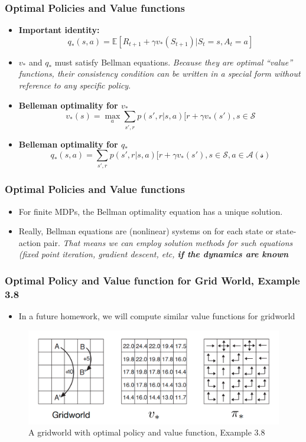 \documentclass{beamer}
\begin{document}
\begin{frame}
  \frametitle{Optimal Policies and Value functions \cite{Sutton2018}}
  \begin{itemize}
  \item {\bf Important identity:}
    \[q_*(s,a) = \mathbb{E}[R_{t+1} + \gamma v_*(S_{t+1}) | S_t = s, A_t = a] \]
  \item $v_*$ and $q_*$ must satisfy Bellman equations. {\em Because they are optimal
      ``value'' functions, their consistency condition can be written in a special form
      without reference to any specific policy}.
  \item {\bf Belleman optimality for $v_*$}
    \[v_*(s) = \max_a \sum_{s',r} p(s',r|s, a)[r + \gamma v_*(s'), s \in \mathcal{S}\]
  \item {\bf Belleman optimality for $q_*$}
    \[q_*(s,a) = \sum_{s',r} p(s',r|s, a)[r + \gamma v_*(s'), s \in \mathcal{S}, a \in \mathcal{A(s)}\]
  \end{itemize}
\end{frame}

\begin{frame}
  \frametitle{Optimal Policies and Value functions \cite{Sutton2018}}
  \begin{itemize}
  \item For finite MDPs, the Bellman optimality equation has a unique solution.
  \item Really, Bellman equations are (nonlinear) systems on for each state or state-action pair.
    {\em That means we can employ solution  methods for such equations (fixed point
      iteration, gradient descent, etc, {\bf if the dynamics are known}}
  \end{itemize}
\end{frame}

\begin{frame}
  \frametitle{Optimal Policy and Value function for Grid World, Example 3.8}
  \begin{itemize}
  \item In a future homework, we will compute similar value functions for gridworld
  \end{itemize}
  \begin{figure}
    \label{fig:gridworld-optimal}
    \includegraphics[width=\textwidth]{../images/sutton3_5_gridworld.png}
    \caption{A gridworld with optimal policy and value function, Example 3.8 \cite{Sutton2018}}
  \end{figure}
\end{frame}
\end{document}
